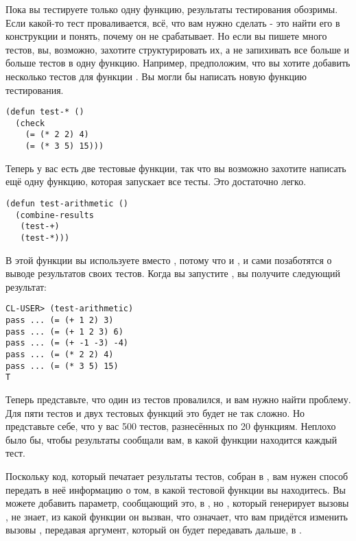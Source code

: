 Пока вы тестируете только одну функцию, результаты тестирования обозримы. Если какой-то
тест проваливается, всё, что вам нужно сделать - это найти его в конструкции 
и понять, почему он не срабатывает. Но если вы пишете много тестов, вы, возможно, захотите
структурировать их, а не запихивать все больше и больше тестов в одну функцию. Например,
предположим, что вы хотите добавить несколько тестов для функции \code{*}. Вы могли бы
написать новую функцию тестирования.

\begin{lstlisting}
(defun test-* ()
  (check
    (= (* 2 2) 4)
    (= (* 3 5) 15)))
\end{lstlisting}

Теперь у вас есть две тестовые функции, так что вы возможно захотите написать ещё одну
функцию, которая запускает все тесты. Это достаточно легко.

\begin{lstlisting}
(defun test-arithmetic ()
  (combine-results
   (test-+)
   (test-*)))
\end{lstlisting}

В этой функции вы используете  вместо , потому что и
, и  сами позаботятся о выводе результатов своих тестов. Когда
вы запустите , вы получите следующий результат:

\begin{lstlisting}
CL-USER> (test-arithmetic)
pass ... (= (+ 1 2) 3)
pass ... (= (+ 1 2 3) 6)
pass ... (= (+ -1 -3) -4)
pass ... (= (* 2 2) 4)
pass ... (= (* 3 5) 15)
T
\end{lstlisting}

Теперь представьте, что один из тестов провалился, и вам нужно найти проблему. Для пяти
тестов и двух тестовых функций это будет не так сложно. Но представьте себе, что у вас 500
тестов, разнесённых по 20 функциям. Неплохо было бы, чтобы результаты сообщали вам, в
какой функции находится каждый тест.

Поскольку код, который печатает результаты тестов, собран в , вам
нужен способ передать в неё информацию о том, в какой тестовой функции вы находитесь. Вы
можете добавить параметр, сообщающий это, в , но , который
генерирует вызовы , не знает, из какой функции он вызван, что
означает, что вам придётся изменить вызовы , передавая аргумент, который он
будет передавать дальше, в .

